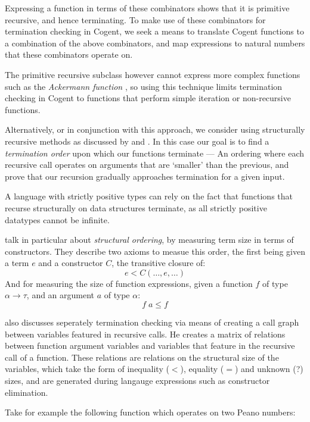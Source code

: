 Expressing a function in terms of these combinators shows that it is primitive recursive,
and hence terminating. To make use of these combinators for termination checking 
in Cogent, we seek a means to translate Cogent functions to a combination of the above
combinators, and map expressions to natural numbers that these combinators operate on.

The primitive recursive subclass however cannot express more complex functions such
as the \textit{Ackermann function} \citep{Ackermann}, so using this technique limits
termination checking in Cogent to functions that perform simple iteration or
non-recursive functions.

Alternatively, or in conjunction with this approach, we consider using
structurally recursive methods as discussed by \citet{StrucrecStructures} and
\citet{PredicateStructrec}. In this case our goal is to find a
\textit{termination order} upon which our functions terminate --- An ordering
where each recursive call operates on arguments that are `smaller' than the
previous, and prove that our recursion gradually 
approaches termination for a given input. 

A language with strictly positive types can rely on the fact that functions that
recurse structurally on data structures terminate, as all strictly positive datatypes
cannot be infinite.

\citet{PredicateStructrec} talk in particular about \textit{structural ordering}, 
by measuring term size in terms of constructors. They describe two axioms to measue
this order, the first being given a term $e$ and a constructor $C$, the transitive closure of:
$$
    e < C (\dots, e, \dots)
$$
And for measuring the size of function expressions, given a function $f$ of 
type $\alpha \longrightarrow \tau$, and an argument $a$ of type $\alpha$:
$$
    f\; a \leq f
$$

\citet{Foetus} also discusses seperately termination checking via means of
creating a call graph between variables featured in recursive calls. He creates
a matrix of relations between function argument variables and variables that
feature in the recursive call of a function. These relations are relations
on the structural size of the variables, which take the form of inequality ($<$),
equality ($=$) and unknown (\textsf{?}) sizes, and are generated during
langauge expressions such as constructor elimination. 

Take for example the following function which operates on two Peano numbers:

